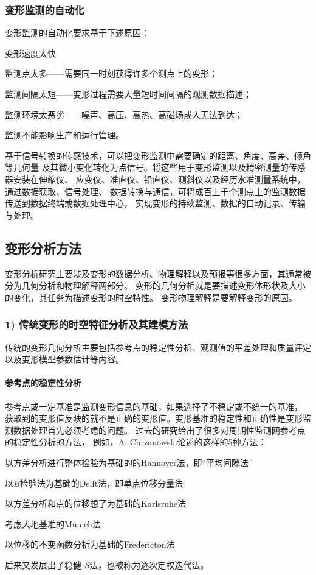 \subsubsection*{变形监测的自动化}
变形监测的自动化要求基于下述原因：
\begin{asparaitem}[$\bullet$]
\item 变形速度太快
\item 监测点太多——需要同一时刻获得许多个测点上的变形；
\item 监测间隔太短——变形过程需要大量短时间间隔的观测数据描述；
\item 监测环境太恶劣——噪声、高压、高热、高磁场或人无法到达；
\item 监测不能影响生产和运行管理。
\end{asparaitem}
基于信号转换的传感技术，可以把变形监测中需要确定的距离、角度、高差、倾角等几何量
及其微小变化转化为点信号。将这些用于变形监测以及精密测量的传感器安装在伸缩仪、
应变仪、准直仪、铅直仪、测斜仪以及经历水准测量系统中，通过数据获取、信号处理、
数据转换与通信，可将成百上千个测点上的监测数据传送到数据终端或数据处理中心，
实现变形的持续监测、数据的自动记录、传输与处理。

\subsection{变形分析方法}
变形分析研究主要涉及变形的数据分析、物理解释以及预报等很多方面，其通常被分为几何分析和物理解释两部分。
变形的几何分析就是要描述变形体形状及大小的变化，其任务为描述变形的时空特性。
变形物理解释是要解释变形的原因。

\subsubsection*{1) 传统变形的时空特征分析及其建模方法}
传统的变形几何分析主要包括参考点的稳定性分析、观测值的平差处理和质量评定以及变形模型参数估计等内容。
\paragraph*{参考点的稳定性分析} 
参考点或一定基准是监测变形信息的基础，如果选择了不稳定或不统一的基准，
获取到的变形值反映的就不是正确的变形值。变形基准的稳定性和正确性是变形监测数据处理首先必须考虑的问题。
过去的研究给出了很多对周期性监测网参考点的稳定性分析的方法，
例如，A. Chrzanowski论述的这样的5种方法：
\begin{asparaitem}[$\bullet$]
\item 以方差分析进行整体检验为基础的的Hannover法，即“平均间隙法”
\item 以$B$检验法为基础的Delft法，即单点位移分量法
\item 以方差分析和点的位移想了为基础的Karlsruhe法
\item 考虑大地基准的Munich法
\item 以位移的不变函数分析为基础的Fredericton法
\end{asparaitem}
后来又发展出了稳健-$S$法，也被称为逐次定权迭代法。

